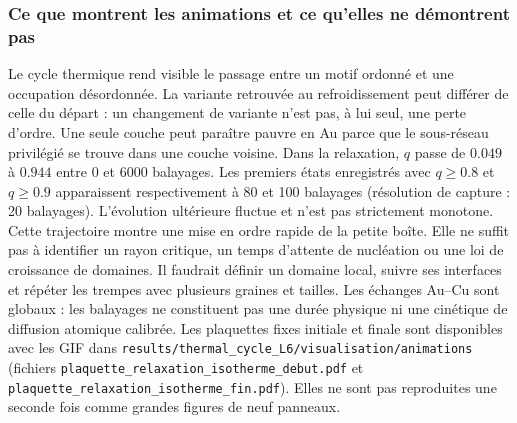 \subsubsection{Ce que montrent les animations et ce qu’elles ne démontrent pas}
Le cycle thermique rend visible le passage entre un motif ordonné et une occupation désordonnée. La variante retrouvée au refroidissement peut différer de celle du départ : un changement de variante n'est pas, à lui seul, une perte d'ordre. Une seule couche peut paraître pauvre en Au parce que le sous-réseau privilégié se trouve dans une couche voisine.
Dans la relaxation, $q$ passe de $0.049$ à $0.944$ entre 0 et 6000 balayages. Les premiers états enregistrés avec $q\geq0.8$ et $q\geq0.9$ apparaissent respectivement à 80 et 100 balayages (résolution de capture : 20 balayages). L'évolution ultérieure fluctue et n'est pas strictement monotone.
Cette trajectoire montre une mise en ordre rapide de la petite boîte. Elle ne suffit pas à identifier un rayon critique, un temps d'attente de nucléation ou une loi de croissance de domaines. Il faudrait définir un domaine local, suivre ses interfaces et répéter les trempes avec plusieurs graines et tailles. Les échanges Au--Cu sont globaux : les balayages ne constituent pas une durée physique ni une cinétique de diffusion atomique calibrée.
Les plaquettes fixes initiale et finale sont disponibles avec les GIF dans \texttt{results/thermal\_cycle\_L6/visualisation/animations} (fichiers \texttt{plaquette\_relaxation\_isotherme\_debut.pdf} et \texttt{plaquette\_relaxation\_isotherme\_fin.pdf}). Elles ne sont pas reproduites une seconde fois comme grandes figures de neuf panneaux.
